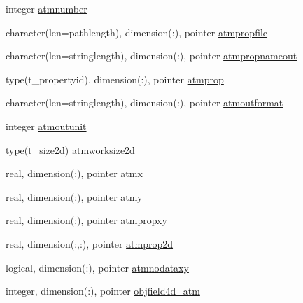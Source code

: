 \begin{DoxyCompactItemize}
\item 
integer \mbox{\hyperlink{structmoduledelft3d__2__mohid_1_1t__delft3d__2__mohid_a57268c2bef53b8d74e6f91696b63eb6a}{atmnumber}}
\item 
character(len=pathlength), dimension(\+:), pointer \mbox{\hyperlink{structmoduledelft3d__2__mohid_1_1t__delft3d__2__mohid_a9bcebd51ef781006507dfeb74a0e663c}{atmpropfile}}
\item 
character(len=stringlength), dimension(\+:), pointer \mbox{\hyperlink{structmoduledelft3d__2__mohid_1_1t__delft3d__2__mohid_ad91c05fac12e27a00510305680918723}{atmpropnameout}}
\item 
type(t\+\_\+propertyid), dimension(\+:), pointer \mbox{\hyperlink{structmoduledelft3d__2__mohid_1_1t__delft3d__2__mohid_a0c6bdf53ea46dfa0b16209239b2aa58d}{atmprop}}
\item 
character(len=stringlength), dimension(\+:), pointer \mbox{\hyperlink{structmoduledelft3d__2__mohid_1_1t__delft3d__2__mohid_a7e9f8b5f9effd45d88a6bb8ea6210bee}{atmoutformat}}
\item 
integer \mbox{\hyperlink{structmoduledelft3d__2__mohid_1_1t__delft3d__2__mohid_a7c34f346777c61bfdda6d2f816498aeb}{atmoutunit}}
\item 
type(t\+\_\+size2d) \mbox{\hyperlink{structmoduledelft3d__2__mohid_1_1t__delft3d__2__mohid_a94bbfb81ae629fe3471aad7119aa3c1a}{atmworksize2d}}
\item 
real, dimension(\+:), pointer \mbox{\hyperlink{structmoduledelft3d__2__mohid_1_1t__delft3d__2__mohid_aa62d91dabfbda129477422693fd3d1af}{atmx}}
\item 
real, dimension(\+:), pointer \mbox{\hyperlink{structmoduledelft3d__2__mohid_1_1t__delft3d__2__mohid_a0158f29d950749fcae1b8c37b8749f65}{atmy}}
\item 
real, dimension(\+:), pointer \mbox{\hyperlink{structmoduledelft3d__2__mohid_1_1t__delft3d__2__mohid_a4531e0d6f80881a8f87985dfff892586}{atmpropxy}}
\item 
real, dimension(\+:,\+:), pointer \mbox{\hyperlink{structmoduledelft3d__2__mohid_1_1t__delft3d__2__mohid_a0153eb6dffbcc399ee4f1991ef342f75}{atmprop2d}}
\item 
logical, dimension(\+:), pointer \mbox{\hyperlink{structmoduledelft3d__2__mohid_1_1t__delft3d__2__mohid_a240b94e0edb310f071d86ddc9185958b}{atmnodataxy}}
\item 
integer, dimension(\+:), pointer \mbox{\hyperlink{structmoduledelft3d__2__mohid_1_1t__delft3d__2__mohid_afce50fe3926e706854a5a2c4b73b3bbe}{objfield4d\+\_\+atm}}
\item 

\end{DoxyCompactItemize}
